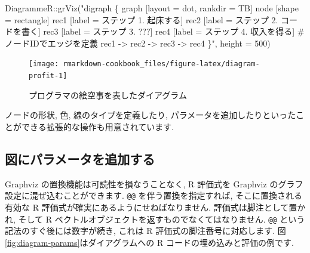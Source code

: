 \documentclass[
  11pt,
]{bxjsreport}
\newenvironment{Shaded}{\begin{snugshade}}{\end{snugshade}}
\newcommand{\AttributeTok}[1]{\textcolor[rgb]{0.77,0.63,0.00}{#1}}
\newcommand{\DecValTok}[1]{\textcolor[rgb]{0.00,0.00,0.81}{#1}}
\newcommand{\FunctionTok}[1]{\textcolor[rgb]{0.00,0.00,0.00}{#1}}
\newcommand{\NormalTok}[1]{#1}
\newcommand{\SpecialCharTok}[1]{\textcolor[rgb]{0.00,0.00,0.00}{#1}}
\newcommand{\StringTok}[1]{\textcolor[rgb]{0.31,0.60,0.02}{#1}}
\begin{document}
\begin{Shaded}
\begin{Highlighting}[numbers=left,,]
\NormalTok{DiagrammeR}\SpecialCharTok{::}\FunctionTok{grViz}\NormalTok{(}\StringTok{"digraph \{}
\StringTok{  graph [layout = dot, rankdir = TB]}
\StringTok{  }
\StringTok{  node [shape = rectangle]        }
\StringTok{  rec1 [label = \textquotesingle{}ステップ 1. 起床する\textquotesingle{}]}
\StringTok{  rec2 [label = \textquotesingle{}ステップ 2. コードを書く\textquotesingle{}]}
\StringTok{  rec3 [label =  \textquotesingle{}ステップ 3. ???\textquotesingle{}]}
\StringTok{  rec4 [label = \textquotesingle{}ステップ 4. 収入を得る\textquotesingle{}]}
\StringTok{  }
\StringTok{  \# ノードIDでエッジを定義}
\StringTok{  rec1 {-}\textgreater{} rec2 {-}\textgreater{} rec3 {-}\textgreater{} rec4}
\StringTok{  \}"}\NormalTok{, }
  \AttributeTok{height =} \DecValTok{500}\NormalTok{)}
\end{Highlighting}
\end{Shaded}

\begin{figure}

{\centering \texttt{[image: rmarkdown-cookbook\_files/figure-latex/diagram-profit-1]} 

}

\caption{プログラマの絵空事を表したダイアグラム}\label{fig:diagram-profit}
\end{figure}

ノードの形状, 色, 線のタイプを定義したり, パラメータを追加したりといったことができる拡張的な操作も用意されています.

\hypertarget{adding-parameters-to-plots}{%
\subsection{図にパラメータを追加する}\label{adding-parameters-to-plots}}

Graphviz の置換機能は可読性を損なうことなく, R 評価式を Graphviz のグラフ設定に混ぜ込むことができます. \texttt{@@} を伴う置換を指定すれば, そこに置換される有効な R 評価式が確実にあるようにせねばなりません. 評価式は脚注として置かれ, そして R ベクトルオブジェクトを返すものでなくてはなりません. \texttt{@@} という記法のすぐ後には数字が続き, これは R 評価式の脚注番号に対応します. 図\ref{fig:diagram-params}はダイアグラムへの R コードの埋め込みと評価の例です.
\end{document}

